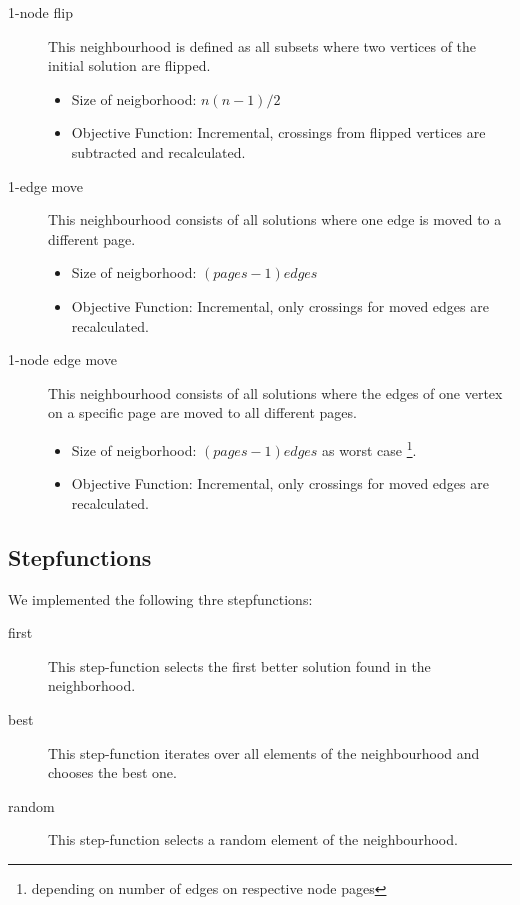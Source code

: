 \documentclass{scrartcl}
\begin{document}
\begin{description}
\item[1-node flip] 
    
    This neighbourhood is defined as all subsets where two vertices of the initial solution are flipped. 
    \begin{itemize}
        \item Size of neigborhood: $n(n-1)/2$
        \item Objective Function: Incremental, crossings from flipped vertices are subtracted and recalculated.

    \end{itemize}

	
\item[1-edge move] This neighbourhood consists of all solutions where one edge is moved to a different page. 
     \begin{itemize}
        \item Size of neigborhood: $(pages-1) edges$ 
        \item Objective Function: Incremental, only crossings for moved edges are recalculated.
    \end{itemize}
   
	
\item[1-node edge move] This neighbourhood consists of all solutions where the edges of
	one vertex on a specific page are moved to all different pages. 

    \begin{itemize}
        \item Size of neigborhood: $(pages-1) edges$ as worst case \footnote{depending on number of edges on respective node pages}.
        \item Objective Function: Incremental, only crossings for moved edges are recalculated.
    \end{itemize}
    

\end{description}

\subsection{Stepfunctions}

We implemented the following thre stepfunctions:

\begin{description}
\item[first] This step-function selects the first better solution found in the neighborhood.
\item[best] This step-function iterates over all elements of the neighbourhood and chooses the best one.
\item[random] This step-function selects a random element of the neighbourhood. 
\end{description}
\end{document}
